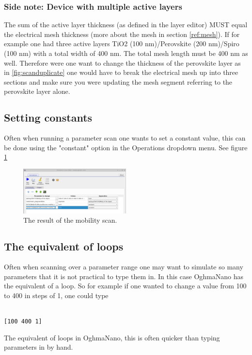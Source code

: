 \subsubsection{Side note: Device with multiple active layers}
The sum of the active layer thickness (as defined in the layer editor) MUST equal the electrical mesh thickness (more about the mesh in section \ref{ref:mesh}).  If for example one had three active layers TiO2 (100 nm)/Perovskite (200 nm)/Spiro (100 nm) with a total width of 400 nm.
The total mesh length must be 400 nm as well.  Therefore were one want to change the thickness of the perovskite layer as in \ref{fig:scanduplicate} one would have to break the electrical mesh up into three sections and make sure you were updating the mesh segment referring to the perovskite layer alone.

\subsection{Setting constants}
Often when running a parameter scan one wants to set a constant value, this can be done using the "constant" option in the Operations dropdown menu. See figure \ref{fig:scanconst}

\begin{figure}[H]
\centering
\includegraphics[width=0.5\textwidth]{./images/param_scan_const.png}
\caption{The result of the mobility scan.}
\label{fig:scanconst}
\end{figure}

\subsection{The equivalent of loops}
Often when scanning over a parameter range one may want to simulate so many parameters that it is not practical to type them in.  In this case OghmaNano has the equivalent of a loop. So for example if one wanted to change a value from 100 to 400 in steps of 1, one could type

\begin{listing}[H]
\begin{verbatim}

[100 400 1]

\end{verbatim}
\caption{The equivalent of loops in OghmaNano, this is often quicker than typing parameters in by hand.} 
\label{json-example}
\end{listing}

